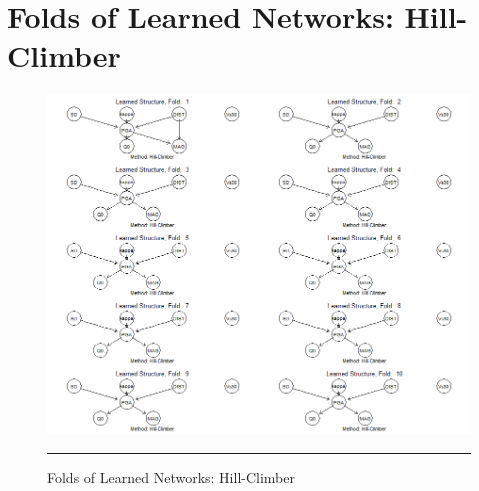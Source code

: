 
\chapter{Folds of Learned Networks: Hill-Climber} %

\label{AppendixB} %

\begin{figure}[htbp]%
	\centering
		\includegraphics[scale=0.5]{Figures/hc.png}
		\rule{35em}{0.5pt}
	\caption[Folds of Learned Networks: Hill-Climber]{Folds of Learned Networks: Hill-Climber}
\end{figure}
